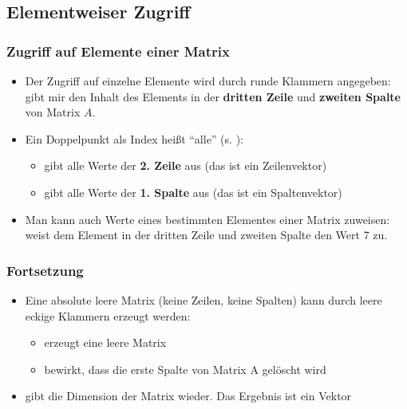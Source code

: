     \subsection{Elementweiser Zugriff}
    \begin{frame}
        \frametitle{Zugriff auf Elemente einer Matrix}
        \begin{itemize}
            \item Der Zugriff auf einzelne Elemente wird durch runde Klammern angegeben:  gibt mir den Inhalt des Elements
            in der \textbf{dritten Zeile} und \textbf{zweiten Spalte} von Matrix $A$.
            \item Ein Doppelpunkt als Index heißt ``alle'' (s. ):
            \begin{itemize}
                \item {} gibt alle Werte der \textbf{2. Zeile} aus (das ist ein Zeilenvektor)
                \item {} gibt alle Werte der \textbf{1. Spalte} aus (das ist ein Spaltenvektor)
            \end{itemize}
            \item Man kann auch Werte eines bestimmten Elementes einer Matrix zuweisen:  weist dem Element in der dritten
            Zeile und zweiten Spalte den Wert 7 zu.
        \end{itemize}
    \end{frame}

    \begin{frame}
        \frametitle{Fortsetzung}
        \begin{itemize}
            \item Eine absolute leere Matrix (keine Zeilen, keine Spalten) kann durch leere eckige Klammern erzeugt werden:
            \begin{itemize}
                \item {} erzeugt eine leere Matrix
                \item {} bewirkt, dass die erste Spalte von Matrix A gelöscht wird
            \end{itemize}
            \item {} gibt die Dimension der Matrix wieder. Das Ergebnis ist ein Vektor 
        \end{itemize}
    \end{frame}

